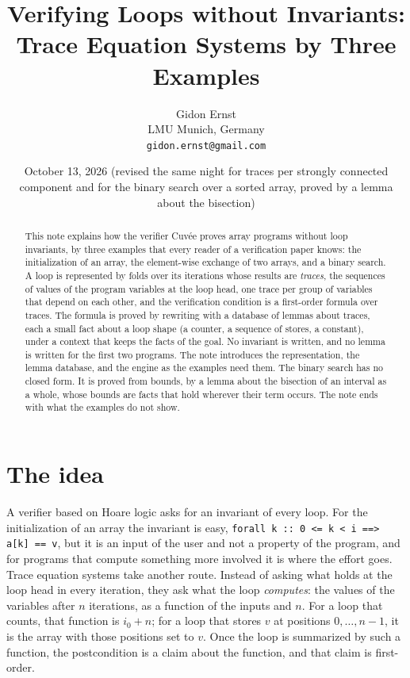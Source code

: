 \documentclass[11pt,a4paper]{article}
\title{Verifying Loops without Invariants:\\ Trace Equation Systems by Three Examples}
\author{Gidon Ernst\\[2pt] \small LMU Munich, Germany\\ \small\texttt{gidon.ernst@gmail.com}}
\date{October 13, 2026 (revised the same night for traces per strongly connected component and for the binary search over a sorted array, proved by a lemma about the bisection)}
\begin{document}
\maketitle

\begin{abstract}
This note explains how the verifier Cuvée proves array programs without loop invariants, by three examples that
every reader of a verification paper knows: the initialization of an array, the element-wise exchange of two
arrays, and a binary search. A loop is represented by folds over its iterations whose results are \emph{traces}, the sequences of values of
the program variables at the loop head, one trace per group of variables that depend on each other, and the
verification condition is a first-order formula over traces. The formula
is proved by rewriting with a database of lemmas about traces, each a small fact about a loop shape (a counter, a
sequence of stores, a constant), under a context that keeps the facts of the goal. No invariant is written, and no
lemma is written for the first two programs. The note introduces the representation, the lemma database, and the
engine as the examples need them. The binary search has no closed form. It is proved from bounds, by a lemma about the bisection of an interval
as a whole, whose bounds are facts that hold wherever their term occurs. The note ends with what the examples do not show.
\end{abstract}

\section{The idea}

A verifier based on Hoare logic asks for an invariant of every loop. For the initialization of an array the invariant
is easy, \lstinline|forall k :: 0 <= k < i ==> a[k] == v|, but it is an input of the user and not a property of the
program, and for programs that compute something more involved it is where the effort goes. Trace equation systems
take another route. Instead of asking what holds at the loop head in every iteration, they ask what the loop
\emph{computes}: the values of the variables after $n$ iterations, as a function of the inputs and $n$. For a loop
that counts, that function is $i_0 + n$; for a loop that stores $v$ at positions $0, \ldots, n-1$, it is the array
with those positions set to $v$. Once the loop is summarized by such a function, the postcondition is a claim about
the function, and that claim is first-order.
\end{document}
